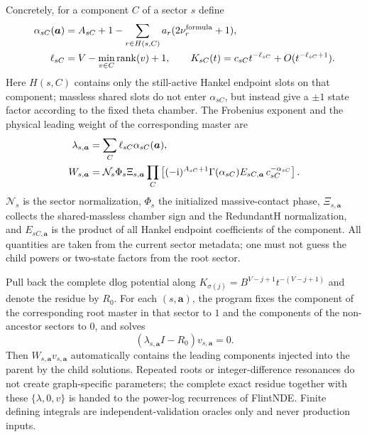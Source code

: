 \documentclass[11pt,a4paper]{article}
\newcommand{\ii}{\mathrm i}
\newcommand{\cN}{\mathcal N}
\begin{document}
Concretely, for a component $C$ of a sector $s$ define
\begin{align}
 \alpha_{sC}(\bm a)&=A_{sC}+1-
 \sum_{r\in H(s,C)}a_r(2\nu_r^{\rm formula}+1),
 \notag\\
 \ell_{sC}&=V-\min_{v\in C}\operatorname{rank}(v)+1,
 \qquad
 K_{sC}(t)=c_{sC}t^{-\ell_{sC}}+O(t^{-\ell_{sC}+1}).
 \label{eq:generic-sector-boundary-component}
\end{align}
Here $H(s,C)$ contains only the still-active Hankel endpoint slots on that component; massless shared slots do not enter $\alpha_{sC}$, but instead give a $\pm1$ state factor according to the fixed theta chamber. The Frobenius exponent and the physical leading weight of the corresponding master are
\begin{align}
 \lambda_{s,\bm a}&=\sum_C\ell_{sC}\alpha_{sC}(\bm a),
 \notag\\
 W_{s,\bm a}&=\cN_s\Phi_s\Xi_{s,\bm a}
 \prod_C\left[
 (-\ii)^{A_{sC}+1}\Gamma(\alpha_{sC})
 E_{sC,\bm a}\,c_{sC}^{-\alpha_{sC}}
 \right].
 \label{eq:generic-sector-boundary-weight}
\end{align}
$\cN_s$ is the sector normalization, $\Phi_s$ the initialized massive-contact phase, $\Xi_{s,\bm a}$ collects the shared-massless chamber sign and the RedundantH normalization, and $E_{sC,\bm a}$ is the product of all Hankel endpoint coefficients of the component. All quantities are taken from the current sector metadata; one must not guess the child powers or two-state factors from the root sector.

Pull back the complete dlog potential along $K_{\sigma(j)}=B^{V-j+1}t^{-(V-j+1)}$ and denote the residue by $R_0$. For each $(s,\bm a)$, the program fixes the component of the corresponding root master in that sector to $1$ and the components of the non-ancestor sectors to $0$, and solves
\begin{equation}
 (\lambda_{s,\bm a}I-R_0)v_{s,\bm a}=0.
 \label{eq:generic-sector-indicial-vector}
\end{equation}
Then $W_{s,\bm a}v_{s,\bm a}$ automatically contains the leading components injected into the parent by the child solutions. Repeated roots or integer-difference resonances do not create graph-specific parameters; the complete exact residue together with these $\{\lambda,0,v\}$ is handed to the power-log recurrences of FlintNDE. Finite defining integrals are independent-validation oracles only and never production inputs.
\end{document}
